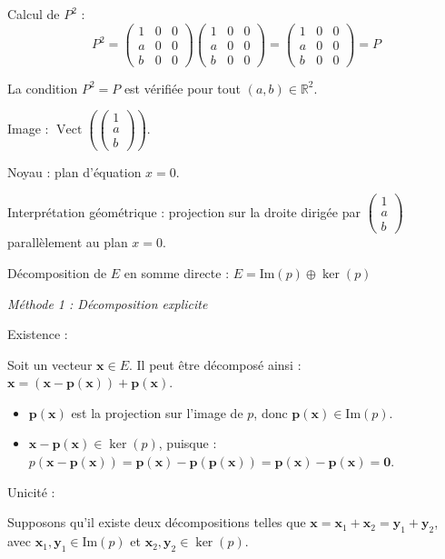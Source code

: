 \documentclass[10pt,a4paper]{article}
\begin{document}
Calcul de $P^2$ :
\[
P^2 =
\begin{pmatrix}
1 & 0 & 0\\
a & 0 & 0\\
b & 0 & 0
\end{pmatrix}
\begin{pmatrix}
1 & 0 & 0\\
a & 0 & 0\\
b & 0 & 0
\end{pmatrix}
=
\begin{pmatrix}
1 & 0 & 0\\
a & 0 & 0\\
b & 0 & 0
\end{pmatrix}
= P
\]

La condition $P^2 = P$ est vérifiée pour tout $(a, b) \in \mathbb{R}^2$.

Image : $\operatorname{Vect}\left(\begin{pmatrix}1\\a\\b\end{pmatrix}\right)$.

Noyau : plan d'équation $x = 0$.

Interprétation géométrique : projection sur la droite dirigée par $\begin{pmatrix}1\\a\\b\end{pmatrix}$ parallèlement au plan $x = 0$.

\q Décomposition de $E$ en somme directe : $E = \mathrm{Im}(p) \oplus \ker(p)$

\textit{Méthode 1 : Décomposition explicite}

Existence :

Soit un vecteur $\mathbf{x} \in E$. Il peut être décomposé ainsi : $\mathbf{x} = (\mathbf{x} - \mathbf{p(x)}) + \mathbf{p(x)}$.
\begin{itemize}
 \item $\mathbf{p(x)}$ est la projection sur l'image de $p$, donc $\mathbf{p(x)} \in \mathrm{Im}(p)$.
 \item $\mathbf{x} - \mathbf{p(x)} \in \ker(p)$, puisque : $p(\mathbf{x} - \mathbf{p(x)}) =  \mathbf{p(x)} - \mathbf{p(p(x))} = \mathbf{p(x)} - \mathbf{p(x)} = \mathbf{0}$.
\end{itemize}

Unicité :

Supposons qu'il existe deux décompositions telles que $\mathbf{x} = \mathbf{x}_1 + \mathbf{x}_2 =
\mathbf{y}_1 + \mathbf{y}_2$, avec $\mathbf{x}_1, \mathbf{y}_1 \in \mathrm{Im}(p)$ et $\mathbf{x}_2,
\mathbf{y}_2 \in \ker(p)$.
\end{document}
